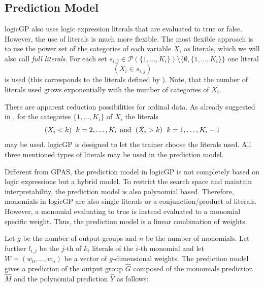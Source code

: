 \documentclass[dvipsnames,format=sigconf,anonymous=false,review=false]{acmart}
\begin{document}
\subsection{Prediction Model}

 logicGP also uses logic expression literals that are evaluated to true or false. However, the use of literals is much more flexible. 
 The most flexible approach is to use the power set of the categories of each variable $X_i$ as literals, which we will also call \emph{full literals}.
 For each set $s_{i,j}\in \mathcal{P}(\{1, \ldots, K_i\}) \setminus \{\emptyset,\{1, \ldots, K_i\} \} $ one literal 
 \begin{equation}\label{eq:lit2}
  \left(X_i \in s_{i,j}\right)
 \end{equation}
  is used (this corresponds to the literals defined by \citet{RudellSangiovanni-Vincentelli1987}). Note, that the number of literals used grows exponentially with the number of categories of $X_i$. 

  There are apparent reduction possibilities for ordinal data. As already suggested in \cite{10.1093/bioinformatics/btm522}, for the categories $\{1, \ldots, K_i\}$ of $X_i$ the literals 
  \begin{equation}\label{eq:lit3}
    \left(X_i < k\right) \hspace*{1ex}k=2,\ldots,K_i\hspace*{1ex}\text{and}\hspace*{1ex}\left(X_i > k\right) \hspace*{1ex}k=1,\ldots,K_{i}-1  
  \end{equation}
   may be used. logicGP is designed to let the trainer choose the literals used. All three mentioned types of literals may be used in the prediction model. 

Different from GPAS, the prediction model in logicGP is not completely based on logic expressions but a hybrid model. To restrict the search space and maintain interpretability, the prediction model is also polynomial based. Therefore, monomials in logicGP are also single literals or a conjunction/product of literals. However, a monomial evaluating to true is instead evaluated to a monomial specific weight. Thus, the prediction model is a linear combination of weights. 

Let $g$ be the number of output groups and $n$ be the number of monomials. Let further $l_{i,j}$ be the $j$-th of $k_i$ literals of the $i$-th monomial and let $W=(w_0,\ldots,w_n)$ be a vector of $g$-dimensional weights. The prediction model gives a prediction of the output group $\hat{G}$ composed of the monomials prediction $\hat{M}$ and the polynomial prediction $\hat{Y}$ as follows:
\end{document}
